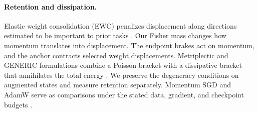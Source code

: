 \paragraph{Retention and dissipation.}
Elastic weight consolidation (EWC) penalizes displacement along
directions estimated to be important to prior tasks
\citep{kirkpatrick2017ewc}. Our Fisher mass changes how momentum translates
into displacement. The endpoint brakes act on momentum, and the anchor
contracts selected weight displacements. Metriplectic and GENERIC
formulations combine a Poisson bracket with a dissipative bracket that
annihilates the total energy \citep{morrison1986framework,grmela1997dynamics}.
We preserve the degeneracy conditions on augmented states and measure
retention separately. Momentum SGD and AdamW serve as comparisons under
the stated data, gradient, and checkpoint budgets
\citep{kingma2015adam,loshchilov2019decoupled}.
